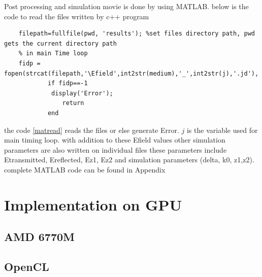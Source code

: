 Post processing and simulation movie is done by using MATLAB. below is the code to read the files written by c++ program
\begin{lstlisting}
	filepath=fullfile(pwd, 'results'); %set files directory path, pwd gets the current directory path
	% in main Time loop
	fidp = fopen(strcat(filepath,'\Efield',int2str(medium),'_',int2str(j),'.jd'),'r','l');
	        if fidp==-1
           	 display('Error');
       	        return
        	end
\end{lstlisting}
the code \ref{matread}  reads the files or else generate Error. $j$ is the variable used for main timing loop. with addition to these Efield values other simulation parameters are also written on individual files these parameters include Etransmitted, Ereflected, Ez1, Ez2 and simulation parameters (delta, k0, z1,z2). complete MATLAB code can be found in Appendix %
\section{Implementation on GPU }

\subsection{AMD 6770M}
 
\subsection{OpenCL}


